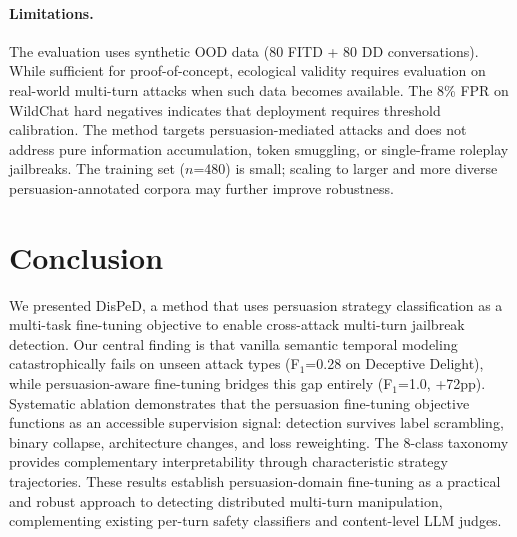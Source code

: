 \documentclass[11pt,a4paper]{article}
\newcommand{\ours}{DisPeD}
\newcommand{\fone}{F$_1$}
\begin{document}
\paragraph{Limitations.}
The evaluation uses synthetic OOD data (80 FITD + 80 DD conversations). While sufficient for proof-of-concept, ecological validity requires evaluation on real-world multi-turn attacks when such data becomes available. The 8\% FPR on WildChat hard negatives indicates that deployment requires threshold calibration. The method targets persuasion-mediated attacks and does not address pure information accumulation, token smuggling, or single-frame roleplay jailbreaks. The training set ($n$=480) is small; scaling to larger and more diverse persuasion-annotated corpora may further improve robustness.


\section{Conclusion}

We presented \ours{}, a method that uses persuasion strategy classification as a multi-task fine-tuning objective to enable cross-attack multi-turn jailbreak detection.
Our central finding is that vanilla semantic temporal modeling catastrophically fails on unseen attack types (\fone{}=0.28 on Deceptive Delight), while persuasion-aware fine-tuning bridges this gap entirely (\fone{}=1.0, +72pp).
Systematic ablation demonstrates that the persuasion fine-tuning objective functions as an accessible supervision signal: detection survives label scrambling, binary collapse, architecture changes, and loss reweighting.
The 8-class taxonomy provides complementary interpretability through characteristic strategy trajectories.
These results establish persuasion-domain fine-tuning as a practical and robust approach to detecting distributed multi-turn manipulation, complementing existing per-turn safety classifiers and content-level LLM judges.


\end{document}
